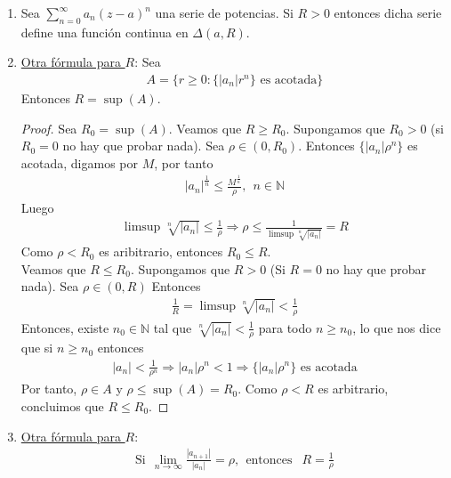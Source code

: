 \begin{obs}
\begin{enumerate}
    \item Sea $\sum_{n=0}^{\infty}{a_n(z-a)^n}$ una serie de potencias. Si $R > 0$ entonces dicha serie define una función continua en $\Delta(a,R)$.
    \item \underline{Otra fórmula para $R$}: Sea
    \begin{align*}
        A = \{ r \ge 0 : \{|a_n|r^n\} \text{ es acotada}\} 
    \end{align*}
    Entonces $R = \sup(A)$.
    \begin{proof}
    Sea $R_0 = \sup(A)$. Veamos que $R \ge R_0$. Supongamos que $R_0 > 0$ (si $R_0 = 0$ no hay que probar nada). Sea $\rho \in (0,R_0)$. Entonces $\{|a_n|\rho^n\}$ es acotada, digamos por $M$, por tanto
    \begin{align*}
        |a_n|^{\frac{1}{n}} \leq \frac{M^{\frac{1}{n}}}{\rho}, \ \ n \in \mathbb{N}
    \end{align*}
    Luego
    \begin{align*}
        \limsup{\sqrt[n]{|a_n|}} \leq \frac{1}{\rho} \Longrightarrow \rho \leq \frac{1}{\limsup{\sqrt[n]{|a_n|}}} = R
    \end{align*}
    Como $\rho < R_0$ es aribitrario, entonces $R_0 \leq R$.
    \\
    \newline
    Veamos que $R \leq R_0$. Supongamos que $R > 0$ (Si $R = 0$ no hay que probar nada). Sea $\rho \in (0,R)$ Entonces
    \begin{align*}
        \frac{1}{R} = \limsup{\sqrt[n]{|a_n|}} < \frac{1}{\rho}
    \end{align*}
    Entonces, existe $n_0 \in \mathbb{N}$ tal que $\sqrt[n]{|a_n|} < \frac{1}{\rho}$ para todo $n \ge n_0$, lo que nos dice que si $n \ge n_0$ entonces
    \begin{align*}
        |a_n| < \frac{1}{\rho^n} \Longrightarrow |a_n|\rho^n < 1 \Longrightarrow \{|a_n|\rho^n \} \text{ es acotada}
    \end{align*}
    Por tanto, $\rho \in A$ y $\rho \leq \sup(A) = R_0$. Como $\rho < R$ es arbitrario, concluimos que $R \leq R_0$.
    \end{proof}
    \item \underline{Otra fórmula para $R$}: 
    \begin{align*}
       \text{Si} \ \ \lim_{n \to \infty}{\frac{|a_{n+1}|}{|a_n|}} = \rho, \ \ \text{entonces } \ \ R = \frac{1}{\rho}
    \end{align*}

\end{enumerate}
\end{obs}
